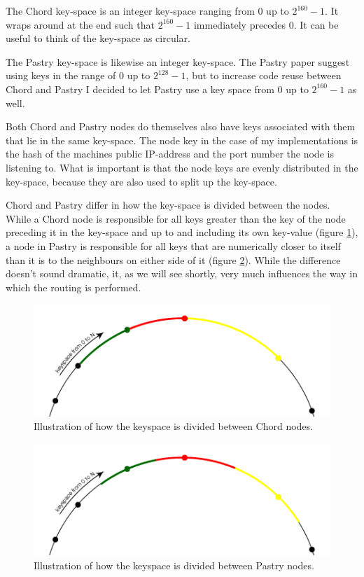 The Chord key-space is an integer key-space ranging from 0 up to $2^{160} - 1$. It wraps around at the end such that $2^{160} - 1$ immediately precedes 0. It can be useful to think of the key-space as circular.

The Pastry key-space is likewise an integer key-space. The Pastry paper suggest using keys in the range of 0 up to $2^{128} - 1$, but to increase code reuse between Chord and Pastry I decided to let Pastry use a key space from 0 up to $2^{160} - 1$ as well.

Both Chord and Pastry nodes do themselves also have keys associated with them that lie in the same key-space. The node key in the case of my implementations is the hash of the machines public IP-address and the port number the node is listening to. What is important is that the node keys are evenly distributed in the key-space, because they are also used to split up the key-space.

Chord and Pastry differ in how the key-space is divided between the nodes. While a Chord node is responsible for all keys greater than the key of the node preceding it in the key-space and up to and including its own key-value (figure \ref{figKeyspaceChord}), a node in Pastry is responsible for all keys that are numerically closer to itself than it is to the neighbours on either side of it (figure \ref{figKeyspacePastry}). While the difference doesn't sound dramatic, it, as we will see shortly, very much influences the way in which the routing is performed.

\begin{figure}[!htb]
\begin{center}
	\includegraphics[width=0.9\linewidth]{illustrations/ChordKeySpace.png}
  \caption{Illustration of how the keyspace is divided between Chord nodes.}
  \label{figKeyspaceChord}
\end{center}
\end{figure}

\begin{figure}[!htb]
\begin{center}
	\includegraphics[width=0.9\linewidth]{illustrations/PastryKeySpace.png}
  \caption{Illustration of how the keyspace is divided between Pastry nodes.}
  \label{figKeyspacePastry}
\end{center}
\end{figure}

